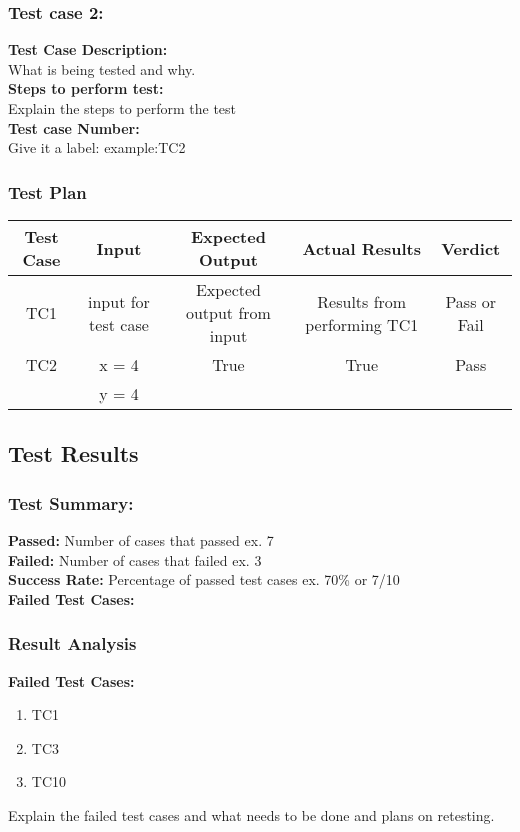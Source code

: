 \documentclass{article}
\begin{document}
\subsubsection{Test case 2: }
\textbf{Test Case Description:\\} What is being tested and why.\\
\textbf{Steps to perform test: \\} Explain the steps to perform the test\\
\textbf{Test case Number: \\} Give it a label: example:TC2

\subsubsection{Test Plan}
\begin{tabular}{|c| c| c| c| c|} 
 \hline
 Test Case & Input & Expected Output & Actual Results & Verdict \\  
 \hline
 TC1 & input for test case &  Expected output from input &  Results from performing TC1& Pass or Fail\\ 
 \hline
 TC2 & x = 4 & True & True & Pass\\
     & y = 4 &      &       &     \\
 \hline
\end{tabular}

\subsection{Test Results}

\subsubsection{Test Summary:}
\textbf{Passed: } Number of cases that passed ex. 7 \\
\textbf{Failed: } Number of cases that failed ex. 3 \\
\textbf{Success Rate: } Percentage of passed test cases ex. 70\% or 7/10 \\
\textbf{Failed Test Cases: }

\subsubsection{Result Analysis}
\textbf{Failed Test Cases: }
\begin{enumerate}
    \item TC1
    \item TC3
    \item TC10
\end{enumerate}

\begin{flushleft}
Explain the failed test cases and what needs to be done and plans on retesting.
\end{flushleft}
\end{document}
